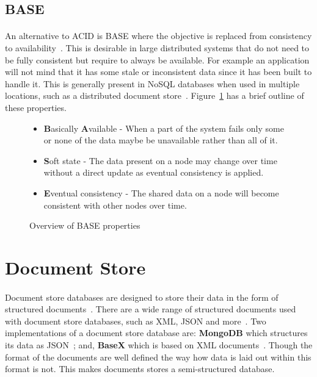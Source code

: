 \documentclass{CRPITStyle}
\renewcommand{\cite}{\citep}
\begin{document}
\subsection{BASE}

\paragraph{}
An alternative to ACID is BASE where the objective is replaced from consistency
to availability~\cite{nosql_survey}.
This is desirable in large distributed systems that do not need to be
fully consistent but require to always be available.
For example an application will not mind that it has some stale or
inconsistent data since it has been built to handle it.
This is generally present in NoSQL databases when used in multiple
locations, such as a distributed document store~\cite{base}.
Figure~\ref{l:base} has a brief outline of these properties.

\begin{figure}
\begin{itemize}
    \item \textbf{B}asically \textbf{A}vailable - When a part of the system
        fails only some or none of the data maybe be unavailable rather than
        all of it.
    \item \textbf{S}oft state - The data present on a node may change over time
        without a direct update as eventual consistency is applied.
    \item \textbf{E}ventual consistency - The shared data on a node will become consistent with
        other nodes over time.
\end{itemize}
\caption{Overview of BASE properties~\cite{base}}\label{l:base}
\end{figure}



\section{Document Store}

\paragraph{}
Document store databases are designed to store their data in the form of
structured documents~\cite{base,nosql_survey}.
There are a wide range of structured documents used with document store
databases, such as XML, JSON and more~\cite{base,compare_nosql}.
Two implementations of a document store database are: \textbf{MongoDB} which
structures its data as JSON~\cite{base}; and, \textbf{BaseX} which is based on XML
documents~\cite{basex}.
Though the format of the documents are well defined the 
way how data is laid out within this format is not.
This makes documents stores a semi-structured database.
\end{document}
